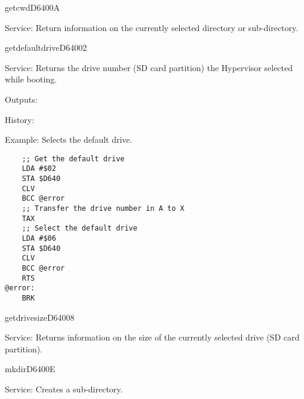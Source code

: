 \newpage
\begin{hyppotrap}{getcwd}{D640}{0A}
\item [Service:]
  Return information on the currently selected directory or sub-directory.
\notimplemented
\end{hyppotrap}


\newpage
\begin{hyppotrap}{getdefaultdrive}{D640}{02}
\item [Service:]
  Returns the drive number (SD card partition) the Hypervisor selected while
  booting.
\item [Outputs:]
\item [History:]
\item [Example:]
  Selects the default drive.
\begin{tcolorbox}[colback=black,coltext=white]
\verbatimfont{\codefont}
\begin{verbatim}
    ;; Get the default drive
    LDA #$02
    STA $D640
    CLV
    BCC @error
    ;; Transfer the drive number in A to X
    TAX
    ;; Select the default drive
    LDA #$06
    STA $D640
    CLV
    BCC @error
    RTS
@error:
    BRK
\end{verbatim}
\end{tcolorbox}
\end{hyppotrap}


\newpage
\begin{hyppotrap}{getdrivesize}{D640}{08}
\item [Service:]
  Returns information on the size of the currently selected drive (SD card
  partition).
\notimplemented
\end{hyppotrap}


\newpage
\begin{hyppotrap}{mkdir}{D640}{0E}
\item [Service:]
  Creates a sub-directory.
\notimplemented
\end{hyppotrap}


